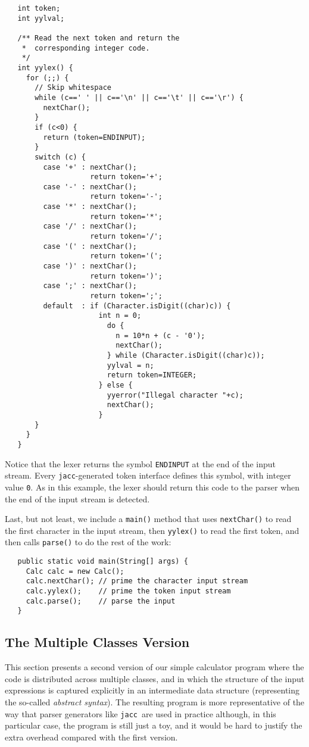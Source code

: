 \documentclass[12pt]{article}
\def\jacc{{\tt jacc}}
\begin{document}
{\small
\begin{verbatim}
   int token;
   int yylval;
 
   /** Read the next token and return the
    *  corresponding integer code.
    */
   int yylex() {
     for (;;) {
       // Skip whitespace
       while (c==' ' || c=='\n' || c=='\t' || c=='\r') {
         nextChar();
       }
       if (c<0) {
         return (token=ENDINPUT);
       }
       switch (c) {
         case '+' : nextChar();
                    return token='+';
         case '-' : nextChar();
                    return token='-';
         case '*' : nextChar();
                    return token='*';
         case '/' : nextChar();
                    return token='/';
         case '(' : nextChar();
                    return token='(';
         case ')' : nextChar();
                    return token=')';
         case ';' : nextChar();
                    return token=';';
         default  : if (Character.isDigit((char)c)) {
                      int n = 0;
                        do {
                          n = 10*n + (c - '0');
                          nextChar();
                        } while (Character.isDigit((char)c));
                        yylval = n;
                        return token=INTEGER;
                      } else {
                        yyerror("Illegal character "+c);
                        nextChar();
                      }
       }
     }
   }
\end{verbatim}
}%
Notice that the lexer returns the symbol \verb"ENDINPUT" at
the end of the input stream.  Every \jacc-generated token
interface defines this symbol, with integer value \verb"0".
As in this example, the lexer should return this code to
the parser when the end of the input stream is detected.

Last, but not least, we include a \verb"main()" method
that uses \verb"nextChar()" to read the first character
in the input stream, then \verb"yylex()" to read the
first token, and then calls \verb"parse()" to do the
rest of the work:
{\small
\begin{verbatim}
   public static void main(String[] args) {
     Calc calc = new Calc();
     calc.nextChar(); // prime the character input stream
     calc.yylex();    // prime the token input stream
     calc.parse();    // parse the input
   }
\end{verbatim}
}%

\subsection{The Multiple Classes Version}\label{sec-example-multi}
This section presents a second version of our simple calculator
program where the code is distributed across multiple classes,
and in which the structure of the input expressions is captured
explicitly in an intermediate data structure (representing the
so-called {\em abstract syntax}).  The resulting program is more
representative of the way that parser generators like \jacc\ are
used in practice although, in this particular case, the program
is still just a toy, and it would be hard to justify the extra
overhead compared with the first version.
\end{document}
